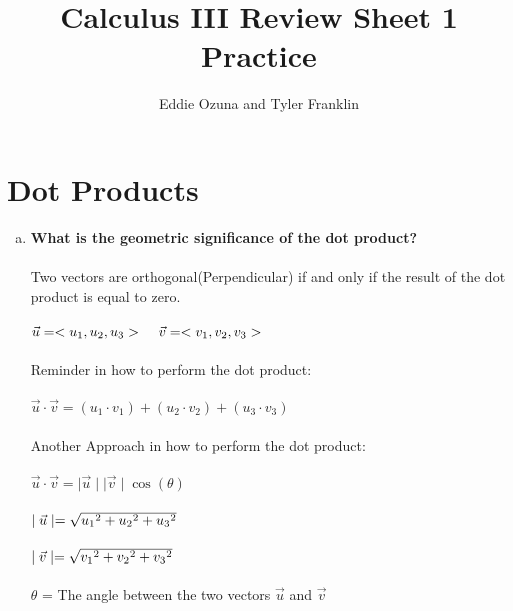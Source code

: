 \documentclass{article}
\title{Calculus III Review Sheet 1 Practice}
\author{Eddie Ozuna and Tyler Franklin}
\begin{document}
\maketitle
\section{Dot Products}
\begin{enumerate}[a.]
	\item \textbf{What is the geometric significance of the dot product? }\\
	\\
Two vectors are orthogonal(Perpendicular) if and only if the result of the dot product is equal to zero.\\\\
$\vec{u} = <u_{1},u_{2},u_{3}>\hspace{.4cm}\vec{v} = <v_{1},v_{2},v_{3}>$\\
\\
Reminder in how to perform the dot product:\\
\\
$\vec{u} \cdot \vec{v} = (u_{1} \cdot v_{1}) + (u_{2} \cdot v_{2}) + (u_{3} \cdot v_{3}) $\\
\\
Another Approach in how to perform the dot product:\\
\\
$\vec{u} \cdot \vec{v} =  \mid\vec{u}\mid\mid\vec{v}\mid\cos(\theta)$\\
\\
$\mid\vec{u}\mid = \sqrt{u_{1}\hspace{.001cm}^{2}+u_{2}\hspace{.001cm}^{2}+u_{3}\hspace{.001cm}^{2}}$\\
\\
$\mid\vec{v}\mid = \sqrt{v_{1}\hspace{.001cm}^{2}+v_{2}\hspace{.001cm}^{2}+v_{3}\hspace{.001cm}^{2}}$\\
\\
$\theta$ = The angle between the two vectors $\vec{u}$ and $\vec{v}$
\end{enumerate}
\end{document}

